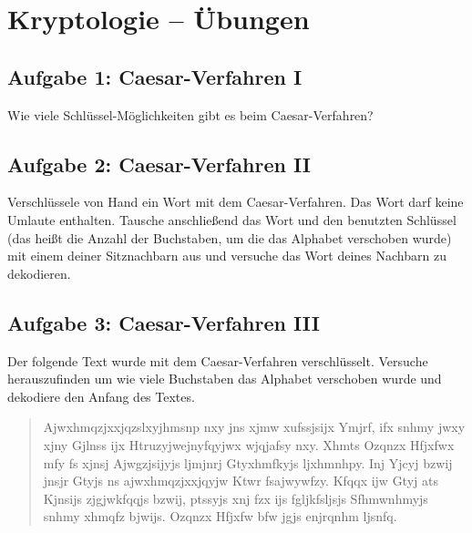 \clearpage

\rehead[]{\textcolor{lightblue}{AvHG, Inf, My}}
\lohead[]{\textcolor{lightblue}{AvHG, Inf, My}}

\section{Kryptologie -- Übungen}

\subsection{Aufgabe 1: Caesar-Verfahren I}

Wie viele Schlüssel-Möglichkeiten gibt es beim Caesar-Verfahren?


\subsection{Aufgabe 2: Caesar-Verfahren II}

Verschlüssele von Hand ein Wort mit dem Caesar-Verfahren. Das Wort darf keine
Umlaute enthalten. Tausche anschließend das Wort und den benutzten Schlüssel
(das heißt die Anzahl der Buchstaben, um die das Alphabet verschoben wurde) mit
einem deiner Sitznachbarn aus und versuche das Wort deines Nachbarn zu dekodieren.


\subsection{Aufgabe 3: Caesar-Verfahren III}

Der folgende Text wurde mit dem Caesar-Verfahren verschlüsselt. Versuche
herauszufinden um wie viele Buchstaben das Alphabet verschoben wurde und
dekodiere den Anfang des Textes.

\begin{quotation}
\noindent
Ajwxhmqzjxxjqzslxyjhmsnp nxy jns xjmw xufssjsijx Ymjrf, ifx snhmy jwxy xjny
Gjlnss ijx Htruzyjwejnyfqyjwx wjqjafsy nxy. Xhmts Ozqnzx Hfjxfwx mfy fs xjnsj
Ajwgzjsijyjs ljmjnrj Gtyxhmfkyjs ljxhmnhpy. Inj Yjcyj bzwij jnsjr Gtyjs ns
ajwxhmqzjxxjqyjw Ktwr fsajwywfzy. Kfqqx ijw Gtyj ats Kjnsijs zjgjwkfqqjs bzwij,
ptssyjs xnj fzx ijs fgljkfsljsjs Sfhmwnhmyjs snhmy xhmqfz bjwijs. Ozqnzx Hfjxfw
bfw jgjs enjrqnhm ljsnfq.
\end{quotation}


